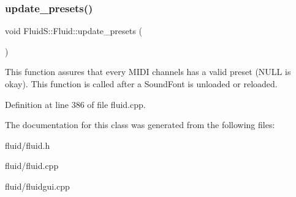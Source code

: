 \subsubsection{\texorpdfstring{update\+\_\+presets()}{update\_presets()}}
{\footnotesize\ttfamily void Fluid\+S\+::\+Fluid\+::update\+\_\+presets (\begin{DoxyParamCaption}{ }\end{DoxyParamCaption})}

This function assures that every M\+I\+DI channels has a valid preset (N\+U\+LL is okay). This function is called after a Sound\+Font is unloaded or reloaded. 

Definition at line 386 of file fluid.\+cpp.



The documentation for this class was generated from the following files\+:\begin{DoxyCompactItemize}
\item 
fluid/fluid.\+h\item 
fluid/fluid.\+cpp\item 
fluid/fluidgui.\+cpp\end{DoxyCompactItemize}

